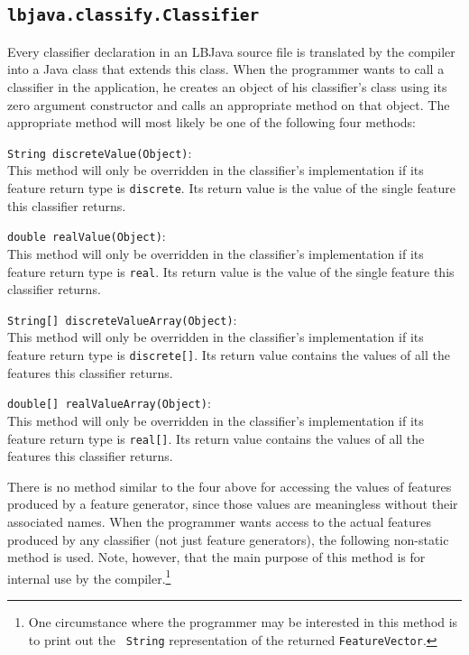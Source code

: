 \subsection{{\tt lbjava.classify.Classifier}} \label{subsection:classifier}
Every classifier declaration in an LBJava source file is translated by the
compiler into a Java class that extends this class.  When the programmer wants
to call a classifier in the application, he creates an object of his
classifier's class using its zero argument constructor and calls an
appropriate method on that object.  The appropriate method will most likely be
one of the following four methods:

\begin{list}{}{}
\item[{\tt String discreteValue(Object)}:] ~\\
This method will only be overridden in the classifier's implementation if its
feature return type is {\tt discrete}.  Its return value is the value of the
single feature this classifier returns.

\item[{\tt double realValue(Object)}:] ~\\
This method will only be overridden in the classifier's implementation if its
feature return type is {\tt real}.  Its return value is the value of the
single feature this classifier returns.

\item[{\tt String[] discreteValueArray(Object)}:] ~\\
This method will only be overridden in the classifier's implementation if its
feature return type is {\tt discrete[]}.  Its return value contains the values
of all the features this classifier returns.

\item[{\tt double[] realValueArray(Object)}:] ~\\
This method will only be overridden in the classifier's implementation if its
feature return type is {\tt real[]}.  Its return value contains the values of
all the features this classifier returns.
\end{list}

There is no method similar to the four above for accessing the values of
features produced by a feature generator, since those values are meaningless
without their associated names.  When the programmer wants access to the
actual features produced by any classifier (not just feature generators), the
following non-static method is used.  Note, however, that the main purpose of
this method is for internal use by the compiler.\footnote{One circumstance
where the programmer may be interested in this method is to print out the {\tt
String} representation of the returned {\tt FeatureVector}.}

